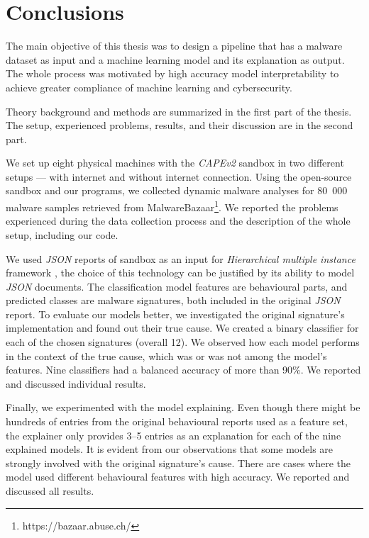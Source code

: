 \chapter{Conclusions} \label{chap:concl}
The main objective of this thesis was to design a pipeline that has a malware dataset as input and a machine learning model and its explanation as output. The whole process was motivated by high accuracy model interpretability to achieve greater compliance of machine learning and cybersecurity.

Theory background and methods are summarized in the first part of the thesis. The setup, experienced problems, results, and their discussion are in the second part.

We set up eight physical machines with the \emph{CAPEv2} sandbox in two different setups --- with internet and without internet connection. Using the open-source sandbox and our programs, we collected dynamic malware analyses for 80~000 malware samples retrieved from MalwareBazaar\footnote{https://bazaar.abuse.ch/}. We reported the problems experienced during the data collection process and the description of the whole setup, including our code.

We used \emph{JSON} reports of sandbox as an input for \emph{Hierarchical multiple instance} framework \cite{Mandlik2020}, the choice of this technology can be justified by its ability to model \emph{JSON} documents. The classification model features are behavioural parts, and predicted classes are malware signatures, both included in the original \emph{JSON} report. 
To evaluate our models better, we investigated the original signature's implementation and found out their true cause. We created a binary classifier for each of the chosen signatures (overall 12). We observed how each model performs in the context of the true cause, which was or was not among the model's features. Nine classifiers had a balanced accuracy of more than 90\%. We reported and discussed individual results.

Finally, we experimented with the model explaining. Even though there might be hundreds of entries from the original behavioural reports used as a feature set, the explainer only provides 3--5 entries as an explanation for each of the nine explained models. It is evident from our observations that some models are strongly involved with the original signature's cause. There are cases where the model used different behavioural features with high accuracy. We reported and discussed all results.

